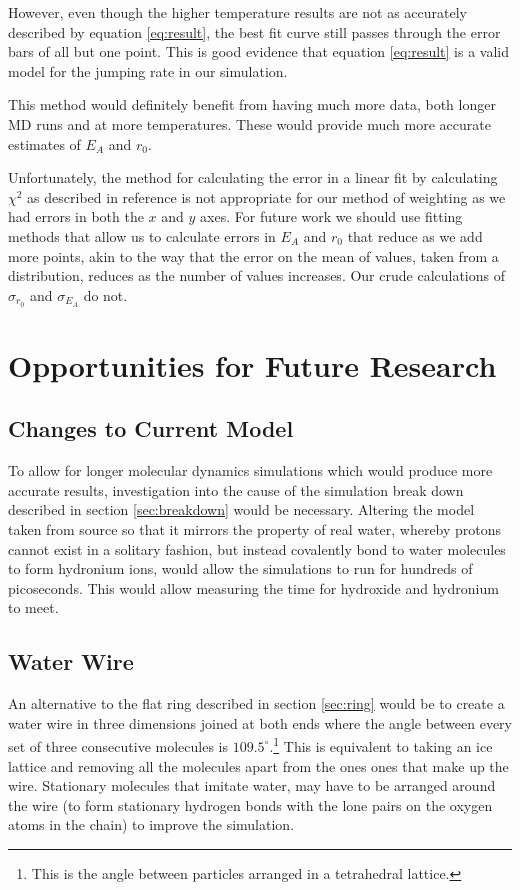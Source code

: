 \documentclass{article}
\begin{document}
\begin{multicols}{2}
However, even though the higher temperature results are not as accurately described by equation \ref{eq:result}, the best fit curve still passes through the error bars of all but one point. This is good evidence that equation \ref{eq:result} is a valid model for the jumping rate in our simulation.

This method would definitely benefit from having much more data, both longer MD runs and at more temperatures. These would provide much more accurate estimates of $E_{A}$ and $r_0$. 

Unfortunately, the method for calculating the error in a linear fit by calculating $\chi^2$ as described in reference \cite{gatland1993weight} is not appropriate for our method of weighting as we had errors in both the $x$ and $y$ axes. For future work we should use fitting methods that allow us to calculate errors in $E_{A}$ and $r_0$ that reduce as we add more points, akin to the way that the error on the mean of values, taken from a distribution, reduces as the number of values increases. Our crude calculations of $\sigma_{r_{0}}$ and $\sigma_{E_{A}}$ do not.

\section{Opportunities for Future Research}

\subsection{Changes to Current Model}
To allow for longer molecular dynamics simulations which would produce more accurate results, investigation into the cause of the simulation break down described in section \ref{sec:breakdown} would be necessary. Altering the model taken from source \cite{Lozovoi2014} so that it mirrors the property of real water, whereby protons cannot exist in a solitary fashion,\cite{bell2013proton} but instead covalently bond to water molecules to form hydronium ions, would allow the simulations to run for hundreds of picoseconds. This would allow measuring the time for hydroxide and hydronium to meet.

\subsection{Water Wire}
An alternative to the flat ring described in section \ref{sec:ring} would be to create a water wire in three dimensions joined at both ends where the angle between every set of three consecutive molecules is $109.5^{\circ}$.\footnote{This is the angle between particles arranged in a tetrahedral lattice.} This is equivalent to taking an ice lattice and removing all the molecules apart from the ones ones that make up the wire. Stationary molecules that imitate water, may have to be arranged around the wire (to form stationary hydrogen bonds with the lone pairs on the oxygen atoms in the chain) to improve the simulation.


\end{multicols}
\end{document}
